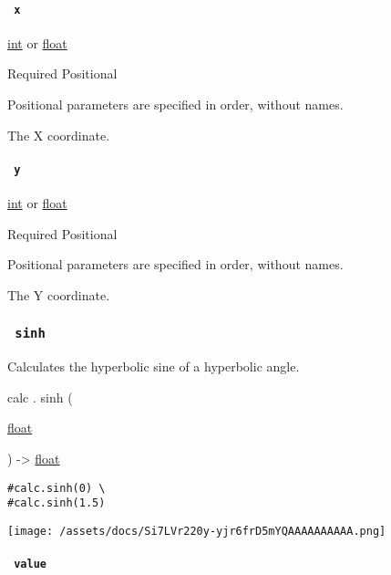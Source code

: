 \paragraph{\texorpdfstring{\texttt{\ x\ }}{ x }}\label{functions-atan2-x}

\href{/docs/reference/foundations/int/}{int} {or}
\href{/docs/reference/foundations/float/}{float}

{Required} {{ Positional }}

\label{functions-atan2-x-positional-tooltip}
Positional parameters are specified in order, without names.

The X coordinate.

\paragraph{\texorpdfstring{\texttt{\ y\ }}{ y }}\label{functions-atan2-y}

\href{/docs/reference/foundations/int/}{int} {or}
\href{/docs/reference/foundations/float/}{float}

{Required} {{ Positional }}

\label{functions-atan2-y-positional-tooltip}
Positional parameters are specified in order, without names.

The Y coordinate.

\subsubsection{\texorpdfstring{\texttt{\ sinh\ }}{ sinh }}\label{functions-sinh}

Calculates the hyperbolic sine of a hyperbolic angle.

calc { . } { sinh } (

{ \href{/docs/reference/foundations/float/}{float} }

) -\textgreater{} \href{/docs/reference/foundations/float/}{float}

\begin{verbatim}
#calc.sinh(0) \
#calc.sinh(1.5)
\end{verbatim}

\texttt{[image: /assets/docs/Si7LVr220y-yjr6frD5mYQAAAAAAAAAA.png]}

\paragraph{\texorpdfstring{\texttt{\ value\ }}{ value }}\label{functions-sinh-value}

